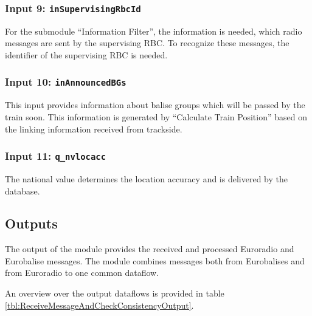 \subsubsection{Input 9: \texttt{inSupervisingRbcId}}
For the submodule ``Information Filter'', the information is needed, which radio messages are sent by the supervising RBC. To recognize these messages, the identifier of the supervising RBC is needed.

\subsubsection{Input 10: \texttt{inAnnouncedBGs}}
This input provides information about balise groups which will be passed by the train soon. This information is generated by ``Calculate Train Position'' based on the linking information received from trackside.

\subsubsection{Input 11: \texttt{q\_nvlocacc}}
The national value determines the location accuracy and is delivered by the database.



\subsection{Outputs}
The output of the module provides the received and processed Euroradio and Eurobalise messages. The module combines messages both from Eurobalises and from Euroradio to one common dataflow.

An overview over the output dataflows is provided in table \ref{tbl:ReceiveMessageAndCheckConsistencyOutput}.

